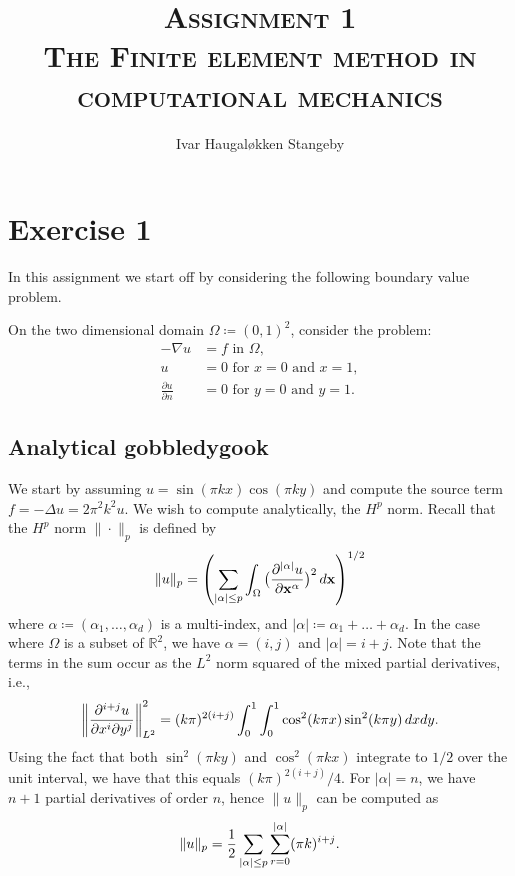 \documentclass[]{article}
\title{\textsc{Assignment 1 \\ The Finite element method in computational mechanics}}
\author{Ivar Haugaløkken Stangeby}
\newcommand{\lapl}{\Delta}
\newcommand{\x}{\mathbf{x}}
\begin{document}
\maketitle    
\section*{Exercise 1}
\label{sec:formulation_of_problem}

In this assignment we start off by considering the following boundary value
problem.

\begin{BVP}
    \label{bvp:one}
    On the two dimensional domain $\Omega \coloneqq (0, 1)^2$, consider the
    problem:
    \begin{align}
        \label{eq:problem}
        -\nabla u &= f \text{ in } \Omega,\\ 
        u &= 0 \text{ for } x = 0 \text{ and } x = 1,\\
        \frac{\partial u}{\partial n} &= 0 \text{ for } y = 0 \text{ and } y = 1.
    \end{align}
\end{BVP}

\subsection*{Analytical gobbledygook}
\label{sub:analytical_}


We start by assuming $u = \sin(\pi k x)\cos(\pi k y)$ and compute the source
term $f = -\lapl u = 2\pi^2 k^2 u$.
We wish to compute analytically, the $H^p$ norm.  Recall that the $H^p$  norm
$\| \cdot \|_p$ is defined by
\begin{equation}
    \notag
    \| u \|_p = \left( \sum^{}_{|\alpha|\leq p} \int_\Omega
    \big(\frac{\partial^{|\alpha|} u}{\partial \x^\alpha}\big)^2 \, d\x
\right)^{1/2}
\end{equation}
where $\alpha \coloneqq (\alpha_1, \ldots, \alpha_d)$ is a multi-index, and
$|\alpha| \coloneqq \alpha_1 + \ldots + \alpha_d$. In the case where $\Omega$
is a subset of $\mathbb{R}^2$, we have $\alpha = (i, j)$ and $|\alpha| = i +
j$. Note that the terms in the sum occur as the $L^2$ norm squared of the mixed
partial derivatives, i.e.,
\begin{align*}
    \notag
    \left\| \frac{\partial^{i+j}u}{\partial x^i \partial y^j} \right\|_{L^2}^2
    = (k \pi)^{2(i+j)}\int_0^1\int_0^1 \cos^2(k\pi x) \sin^2(k\pi y) \, dx dy.
\end{align*}
Using the fact that both $\sin^2(\pi k y)$ and $\cos^2(\pi k x)$ integrate to
$1/2$ over the unit interval, we have that this equals $(k \pi)^{2(i+j)}/4$.
For $|\alpha| = n$, we have $n + 1$ partial derivatives of order $n$, hence
$\| u\|_p$ can be computed as
\begin{equation}
    \notag
    \| u \|_p = \frac{1}{2}\sum^{}_{|\alpha| \leq p} \sum_{r = 0}^{ |\alpha| } (\pi k)^{i+j}.
\end{equation}
\end{document}
